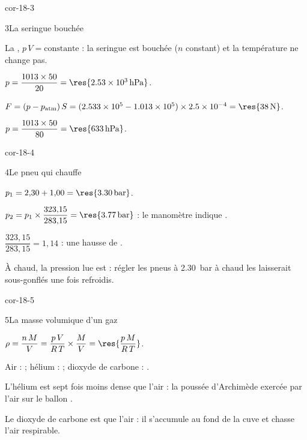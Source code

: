 \begin{blocLivre}{cor-18-3}
\begin{corrige}{3}{La seringue bouchée}
\begin{questions}
\item La , $p\,V=\text{constante}$ : la seringue est bouchée ($n$ constant) et la température ne
change pas.
\item $p=\dfrac{1013\times50}{20}=\res{\qty{2,53e3}{hPa}}$.
\item $F=(p-p_\mathrm{atm})\,S=(\num{2.533e5}-\num{1.013e5})\times\num{2.5e-4}=\res{\qty{38}{N}}$.
\item $p=\dfrac{1013\times50}{80}=\res{\qty{633}{hPa}}$.
\end{questions}
\end{corrige}
\end{blocLivre}
\begin{blocLivre}{cor-18-4}
\begin{corrige}{4}{Le pneu qui chauffe}
\begin{questions}
\item $p_1=2{,}30+1{,}00=\res{\qty{3,30}{bar}}$.
\item $p_2=p_1\times\dfrac{323{,}15}{283{,}15}=\res{\qty{3,77}{bar}}$ : le manomètre indique .
\item $\dfrac{323{,}15}{283{,}15}=1{,}14$ : une hausse de .
\item À chaud, la pression lue est  : régler les pneus à \qty{2,30}{bar} à chaud les laisserait
sous-gonflés une fois refroidis.
\end{questions}
\end{corrige}
\end{blocLivre}
\begin{blocLivre}{cor-18-5}
\begin{corrige}{5}{La masse volumique d'un gaz}
\begin{questions}
\item $\rho=\dfrac{n\,M}{V}=\dfrac{p\,V}{R\,T}\times\dfrac{M}{V}=\res{\dfrac{p\,M}{R\,T}}$.
\item Air :  ; hélium :  ; dioxyde de carbone : .
\item L'hélium est sept fois moins dense que l'air : la poussée d'Archimède exercée par l'air sur le ballon
.
\item Le dioxyde de carbone est  que l'air : il s'accumule au fond de la cuve et chasse
l'air respirable.
\end{questions}
\end{corrige}
\end{blocLivre}
